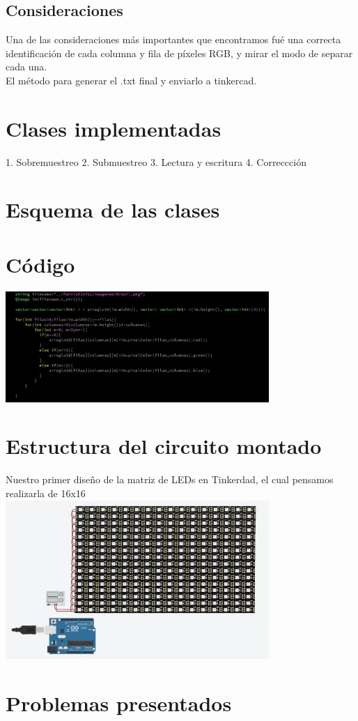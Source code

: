 \documentclass{article}
\begin{document}
\subsection{Consideraciones}
Una de las consideraciones más importantes que encontramos fué una correcta identificación de cada columna y fila de píxeles RGB, y mirar el modo de separar cada una.\\
El método para generar el .txt final y enviarlo a tinkercad.\\



\section{Clases implementadas}
1. Sobremuestreo
2. Submuestreo
3. Lectura y escritura
4. Correccción

\section{Esquema de las clases}

\section{Código}
\includegraphics[width=10cm]{Imagenes/Codigo_1.jpeg}


\section{Estructura del circuito montado}
Nuestro primer diseño de la matriz de LEDs en Tinkerdad, el cual pensamos realizarla de 16x16\\
\includegraphics[width=10cm]{Imagenes/circuito_1.jpeg}

\section{Problemas presentados}
\end{document}
